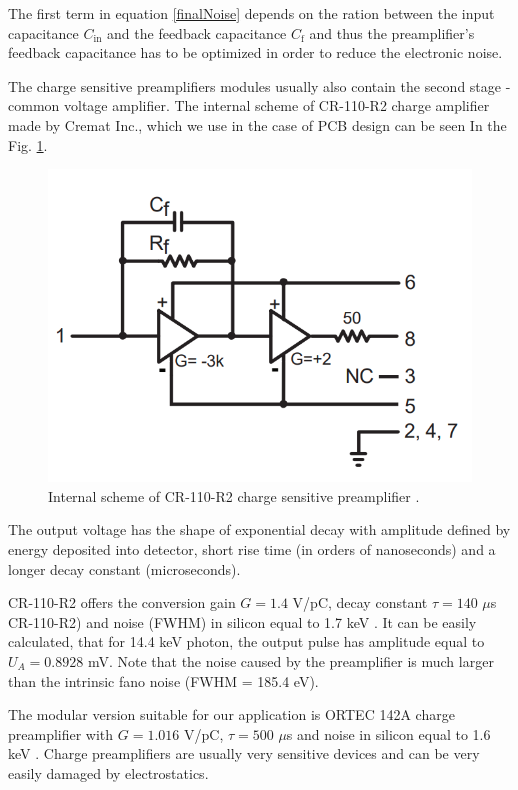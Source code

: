 \par
The first term in equation \ref{finalNoise} depends on the ration between the input capacitance $C_{\textrm{in}}$ and the feedback capacitance $C_{\textrm{f}}$ and thus the preamplifier's feedback capacitance has to be optimized in order to reduce the electronic noise.
\par
The charge sensitive preamplifiers modules usually also contain the second stage - common voltage amplifier. The internal scheme of CR-110-R2 charge amplifier made by Cremat Inc., which we use in the case of PCB design can be seen In the Fig. \ref{internal}.
\par
\begin{figure}[H]
 \centering
 \includegraphics[scale=0.35, angle = 0]{./pictures/CRpreamp.png}
 \caption{Internal scheme of CR-110-R2 charge sensitive preamplifier \cite{cr110}.}
 \label{internal}
 
\end{figure}
The output voltage has the shape of exponential decay with amplitude defined by energy deposited into detector, short rise time (in orders of nanoseconds) and a longer decay constant (microseconds).


CR-110-R2 offers the conversion gain $G = 1.4$ V/pC, decay constant $\tau = 140$ $\mu$s CR-110-R2) and noise (FWHM) in silicon equal to 1.7 keV \cite{cr110}. It can be easily calculated, that for 14.4 keV photon, the output pulse has amplitude equal to $U_{A} = 0.8928$ mV. 
Note that the noise caused by the preamplifier is much larger than the intrinsic fano noise (FWHM = 185.4 eV).


\par
The modular version suitable for our application is ORTEC 142A charge preamplifier with $G = 1.016$ V/pC, $\tau = 500$ $\mu$s and noise in silicon equal to 1.6 keV \cite{ORTECpreamp}. Charge preamplifiers are usually very sensitive devices and can be very easily damaged by electrostatics. 


